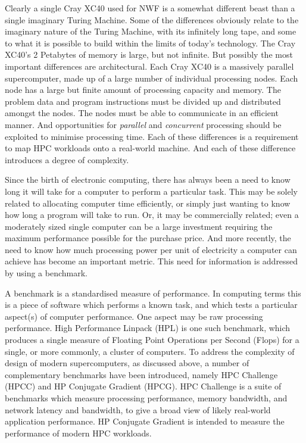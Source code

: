 Clearly a single Cray XC40 used for NWF is a somewhat different beast than a single imaginary Turing Machine. Some of the differences obviously relate to the imaginary nature of the Turing Machine, with its infinitely long tape, and some to what it is possible to build within the limits of today's technology. The Cray XC40's 2 Petabytes of memory is large, but not infinite. But possibly the most important differences are architectural. Each Cray XC40 is a massively parallel supercomputer, made up of a large number of individual processing nodes. Each node has a large but finite amount of processing capacity and memory. The problem data and program instructions must be divided up and distributed amongst the nodes. The nodes must be able to communicate in an efficient manner. And opportunities for \emph{parallel} and \emph{concurrent} processing should be exploited to minimise processing time. Each of these differences is a requirement to map HPC workloads onto a real-world machine. And each of these difference introduces a degree of complexity.   

Since the birth of electronic computing, there has always been a need to know long it will take for a computer to perform a particular task. This may be solely related to allocating computer time efficiently, or simply just wanting to know how long a program will take to run. Or, it may be commercially related; even a moderately sized single computer can be a large investment requiring the maximum performance possible for the purchase price. And more recently, the need to know how much processing power per unit of electricity a computer can achieve has become an important metric. This need for information is addressed by using a benchmark.

A benchmark is a standardised measure of performance. In computing terms this is a piece of software which performs a known task, and which tests a particular aspect(s) of computer performance. One aspect may be raw processing performance. High Performance Linpack (HPL) is one such benchmark, which produces a single measure of Floating Point Operations per Second (Flops) for a single, or more commonly, a cluster of computers. To address the complexity of design of modern supercomputers, as discussed above, a number of complementary benchmarks have been introduced, namely HPC Challenge (HPCC) and HP Conjugate Gradient (HPCG). HPC Challenge is a suite of benchmarks which measure processing performance, memory bandwidth, and network latency and bandwidth, to give a broad view of likely real-world application performance. HP Conjugate Gradient is intended to measure the performance of modern HPC workloads.

